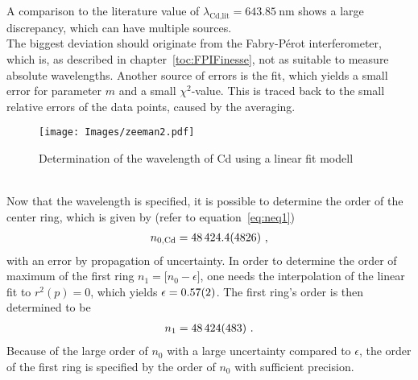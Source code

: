 A comparison to the literature value of $\lambda_\text{Cd,lit} = \SI{643.85}{\nm}$ shows a large discrepancy, which can have multiple sources.\\
The biggest deviation should originate from the Fabry-P\'erot interferometer, which is, as described in chapter~\ref{toc:FPIFinesse}, not as suitable to measure absolute wavelengths. 
Another source of errors is the fit, which yields a small error for parameter $m$ and a small $\chi^2$-value. 
This is traced back to the small relative errors of the data points, caused by the averaging.\\
\begin{figure}[ht]
	\centering
	\texttt{[image: Images/zeeman2.pdf]}
	\caption[Determination of the Wavelength of Cd]{Determination of the wavelength of Cd using a linear fit modell}
	\label{fig:CdWavelengthFit}
\end{figure}\\
Now that the wavelength is specified, it is possible to determine the order of the center ring, which is given by (refer to equation~\ref{eq:neq1})
\begin{align}
	n_{0,\text{Cd}} = \num{48424.4 \pm 482.6}\ ,
\end{align}
with an error by propagation of uncertainty. 
In order to determine the order of maximum of the first ring $n_1 = \lbrack n_0 - \epsilon \rbrack$, one needs the interpolation of the linear fit to $r^2(p) = 0$, which yields $\epsilon = \num{0.57 \pm 0.02}$. 
The first ring's order is then determined to be
\begin{align}
	n_1 = \num{48424 \pm 483}\ .
\end{align}
Because of the large order of $n_0$ with a large uncertainty compared to $\epsilon$, the order of the first ring is specified by the order of $n_0$ with sufficient precision.
